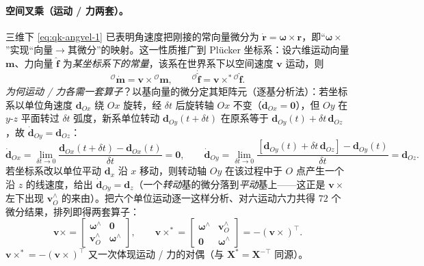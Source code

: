 \paragraph{空间叉乘（运动 / 力两套）。}
三维下 \cref{eq:qk-angvel-1} 已表明角速度把刚接的常向量微分为 $\dot{\boldsymbol{r}}=\boldsymbol{\omega}\times\boldsymbol{r}$，即“$\boldsymbol{\omega}\times$”实现“向量$\to$其微分”的映射。这一性质推广到 Plücker 坐标系：设六维运动向量 $\boldsymbol{m}$、力向量 $\hat{\boldsymbol{f}}$ 为\emph{某坐标系下的常量}，该系在世界系下以空间速度 $\boldsymbol{v}$ 运动，则\cite{yu2021quadruped}
\begin{equation}
  {}^{\mathcal{O}}\dot{\boldsymbol{m}}=\boldsymbol{v}\times{}^{\mathcal{O}}\boldsymbol{m},
  \qquad
  {}^{\mathcal{O}}\dot{\hat{\boldsymbol{f}}}=\boldsymbol{v}\times^{*}{}^{\mathcal{O}}\hat{\boldsymbol{f}}.
  \label{eq:qk-spatial-cross-def}
\end{equation}
\emph{为何运动 / 力各需一套算子}？以基向量的微分定其矩阵元（逐基分析法）：若坐标系以单位角速度 $\boldsymbol{d}_{Ox}$ 绕 $Ox$ 旋转，经 $\delta t$ 后旋转轴 $Ox$ 不变（$\dot{\boldsymbol{d}}_{Ox}=\mathbf{0}$），但 $Oy$ 在 $y$-$z$ 平面转过 $\delta t$ 弧度，新系单位转动 $\boldsymbol{d}_{Oy}(t+\delta t)$ 在原系等于 $\boldsymbol{d}_{Oy}(t)+\delta t\,\boldsymbol{d}_{Oz}$，故 $\dot{\boldsymbol{d}}_{Oy}=\boldsymbol{d}_{Oz}$\cite{yu2021quadruped}：
\begin{equation}
  \dot{\boldsymbol{d}}_{Ox}=\lim_{\delta t\to0}\frac{\boldsymbol{d}_{Ox}(t+\delta t)-\boldsymbol{d}_{Ox}(t)}{\delta t}=\mathbf{0},
  \qquad
  \dot{\boldsymbol{d}}_{Oy}=\lim_{\delta t\to0}\frac{[\boldsymbol{d}_{Oy}(t)+\delta t\,\boldsymbol{d}_{Oz}]-\boldsymbol{d}_{Oy}(t)}{\delta t}=\boldsymbol{d}_{Oz}.
  \label{eq:qk-spatial-cross-micro}
\end{equation}
若坐标系改以单位平动 $\boldsymbol{d}_x$ 沿 $x$ 移动，则转动轴 $Oy$ 在该过程中于 $O$ 点产生一个沿 $z$ 的线速度，给出 $\dot{\boldsymbol{d}}_{Oy}=\boldsymbol{d}_z$（一个\emph{转动}基的微分落到\emph{平动}基上——这正是 $\boldsymbol{v}\times$ 左下出现 $\boldsymbol{v}_O^{\wedge}$ 的来由）。把六个单位运动逐一这样分析、对六运动六力共得 $72$ 个微分结果，排列即得两套算子\cite{yu2021quadruped}：
\begin{equation}
  \boldsymbol{v}\times=\begin{bmatrix}\boldsymbol{\omega}^{\wedge}&\mathbf{0}\\\boldsymbol{v}_O^{\wedge}&\boldsymbol{\omega}^{\wedge}\end{bmatrix},
  \qquad
  \boldsymbol{v}\times^{*}=\begin{bmatrix}\boldsymbol{\omega}^{\wedge}&\boldsymbol{v}_O^{\wedge}\\\mathbf{0}&\boldsymbol{\omega}^{\wedge}\end{bmatrix}=-(\boldsymbol{v}\times)^\top.
  \label{eq:qk-spatial-cross}
\end{equation}
$\boldsymbol{v}\times^{*}=-(\boldsymbol{v}\times)^\top$ 又一次体现运动 / 力的对偶（与 $\mathbf{X}^{*}=\mathbf{X}^{-\top}$ 同源）。

